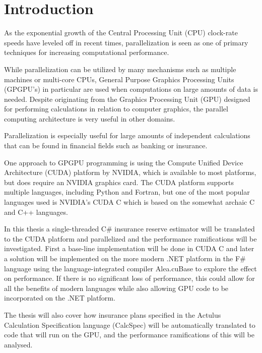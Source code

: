 \section{Introduction}
As the exponential growth of the Central Processing Unit (CPU) clock-rate speeds have leveled off in recent times\cite{ross2008cpu}, parallelization is seen as one of primary techniques for increasing computational performance. %

While parallelization can be utilized by many mechanisms such as multiple machines or multi-core CPUs, General Purpose Graphics Processing Units (GPGPU's) in particular are used when computations on large amounts of data is needed. 
Despite originating from the Graphics Processing Unit (GPU) designed for performing calculations in relation to computer graphics, the parallel computing architecture is very useful in other domains.

Parallelization is especially useful for large amounts of independent calculations that can be found in financial fields such as banking or insurance.

One approach to GPGPU programming is using the Compute Unified Device Architecture (CUDA) platform by NVIDIA, which is available to most platforms, but does require an NVIDIA graphics card.
The CUDA platform supports multiple languages, including Python and Fortran, but one of the most popular languages used is NVIDIA's CUDA C which is based on the somewhat archaic C and C++ languages.

In this thesis a single-threaded C\# insurance reserve estimator will be translated to the CUDA platform and parallelized and the performance ramifications will be investigated.
First a base-line implementation will be done in CUDA C and later a solution will be implemented on the more modern .NET platform in the F\# language using the language-integrated compiler Alea.cuBase to explore the effect on performance.
If there is no significant loss of performance, this could allow for all the benefits of modern languages while also allowing GPU code to be incorporated on the .NET platform.


The thesis will also cover how insurance plans specified in the Actulus Calculation Specification language (CalcSpec) will be automatically translated to code that will run on the GPU, and the performance ramifications of this will be analysed.

